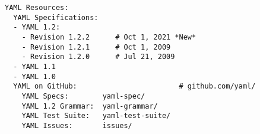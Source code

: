 \documentclass{article}
\begin{document}
\begin{verbatim}
YAML Resources:
  YAML Specifications:
  - YAML 1.2:
    - Revision 1.2.2      # Oct 1, 2021 *New*
    - Revision 1.2.1      # Oct 1, 2009
    - Revision 1.2.0      # Jul 21, 2009
  - YAML 1.1
  - YAML 1.0
  YAML on GitHub:                        # github.com/yaml/
    YAML Specs:        yaml-spec/
    YAML 1.2 Grammar:  yaml-grammar/
    YAML Test Suite:   yaml-test-suite/
    YAML Issues:       issues/
\end{verbatim}
\end{document}
